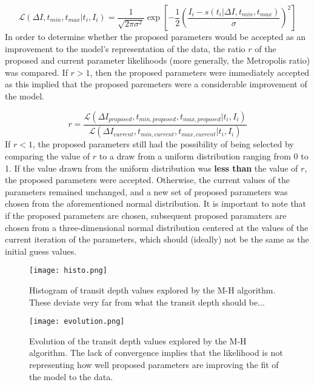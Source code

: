\documentclass{article}
\begin{document}
\begin{equation}
\mathcal{L}(\Delta I, t_{min}, t_{max} | t_i, I_i) = \frac{1}{\sqrt{2 \pi \sigma^2}}\exp{\left[-\frac{1}{2}\left(\frac{I_i - s(t_i | \Delta I, t_{min}, t_{max})}{\sigma}\right)^2\right]} 
\label{eq:likelihood}
\end{equation}
%
In order to determine whether the proposed parameters would be accepted as an improvement to the model's representation of the data, the ratio $r$ of the proposed and current parameter likelihoods (more generally, the Metropolis ratio) was compared. If $r > 1$, then the proposed parameters were immediately accepted as this implied that the proposed paremeters were a considerable improvement of the model. 

\begin{equation}
r = \frac{\mathcal{L}(\Delta I_{proposed}, t_{min, proposed}, t_{max, proposed} | t_i, I_i)}{\mathcal{L}(\Delta I_{current}, t_{min, current}, t_{max, current} | t_i, I_i)}
\end{equation}
%
If $r < 1$, the proposed parameters still had the possibility of being selected by comparing the value of $r$ to a draw from a uniform distribution ranging from 0 to 1. If the value drawn from the uniform distribution was \textbf{less than} the value of $r$, the proposed parameters were accepted. Otherwise, the current values of the parameters remained unchanged, and a new set of proposed parameters was chosen from the aforementioned normal distribution. It is important to note that if the proposed parameters are chosen, subsequent proposed paramaters are chosen from a three-dimensional normal distribution centered at the values of the current iteration of the parameters, which should (ideally) not be the same as the initial guess values.

\begin{figure}[ht!]
\texttt{[image: histo.png]}
\caption{Histogram of transit depth values explored by the M-H algorithm. These deviate very far from what the transit depth should be...}
\label{fig:histo}
\end{figure}

\begin{figure}[ht!]
\texttt{[image: evolution.png]}
\caption{Evolution of the transit depth values explored by the M-H algorithm. The lack of convergence implies that the likelihood is not representing how well proposed parameters are improving the fit of the model to the data.}
\label{fig:evolution}
\end{figure}
\end{document}

